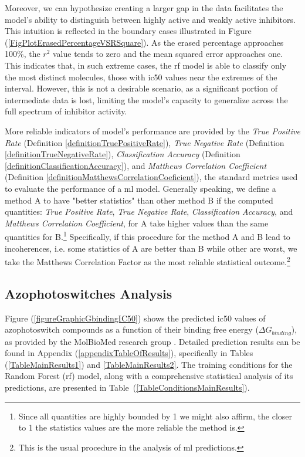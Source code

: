 \documentclass[11pt]{article}
\begin{document}
Moreover, we can hypothesize creating a larger gap in the data facilitates the model’s ability to distinguish between highly active and weakly active inhibitors. This intuition is reflected in the boundary cases illustrated in Figure (\ref{FigPlotErasedPercentageVSRSquare}). As the erased percentage approaches 100\%, the $r^2$ value tends to zero and the mean squared error approaches one. This indicates that, in such extreme cases, the \gls{rf} model is able to classify only the most distinct molecules, those with \gls{ic50} values near the extremes of the interval. However, this is not a desirable scenario, as a significant portion of intermediate data is lost, limiting the model’s capacity to generalize across the full spectrum of inhibitor activity.

More reliable indicators of model's performance are provided by the \emph{True Positive Rate} (Definition \ref{definitionTruePositiveRate}), \emph{True Negative Rate} (Definition \ref{definitionTrueNegativeRate}), \emph{Classification Accuracy} (Definition \ref{definitionClassificationAccuracy}), and \emph{Matthews Correlation Coefficient} (Definition \ref{definitionMatthewsCorrelationCoeficient}), the standard metrics used to evaluate the performance of a \gls{ml} model. Generally speaking, we define a method A to have "better statistics" than other method B if the computed quantities: \emph{True Positive Rate}, \emph{True Negative Rate}, \emph{Classification Accuracy}, and \emph{Matthews Correlation Coefficient}, for A take higher values than the same quantities for B.\footnote{Since all quantities are highly bounded by 1 we might also affirm, the closer to 1 the statistics values are the more reliable the method is.} Specifically, if this procedure for the method A and B lead to incoherences, i.e. some statistics of A are better than B while other are worst, we take the Matthews Correlation Factor as the most reliable statistical outcome.\footnote{This is the usual procedure in the analysis of \gls{ml} predictions\cite{MachineLearningPaper5Lipoxygenase}.}

\subsection{Azophotoswitches Analysis}

\hspace{0.55cm}Figure (\ref{figureGraphicGbindingIC50}) shows the predicted \gls{ic50} values of azophotoswitch compounds as a function of their binding free energy ($\Delta G_{binding}$), as provided by the MolBioMed research group \cite{molbiomed}. Detailed prediction results can be found in Appendix (\ref{appendixTableOfResults}), specifically in Tables (\ref{TableMainResults1}) and \ref{TableMainResults2}. The training conditions for the Random Forest (\gls{rf}) model, along with a comprehensive statistical analysis of its predictions, are presented in Table~(\ref{TableConditionsMainResults}).
\end{document}
